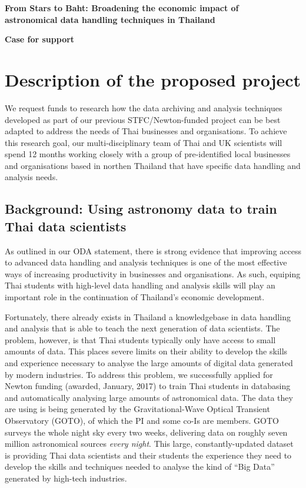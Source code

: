 \documentclass[11pt]{article}
\begin{document}
\setcounter{figure}{0}
\noindent
{\LARGE \bf From Stars to Baht: Broadening the economic impact of \\
astronomical data handling techniques in Thailand}

\vspace{3mm}

\noindent
{\LARGE \bf Case for support}
\section{Description of the proposed project}
\noindent
We request funds to research how the data archiving and analysis techniques developed as part of our previous STFC/Newton-funded project can be best adapted to address the needs of Thai businesses and organisations. To achieve this research goal, our multi-disciplinary team of Thai and UK scientists will spend 12 months working closely with a group of pre-identified local businesses and organisations based in northen Thailand that have specific data handling and analysis needs.

\subsection{Background: Using astronomy data to train Thai data scientists}
As outlined in our ODA statement, there is strong evidence that improving access to advanced data handling and analysis techniques is one of the most effective ways of increasing productivity in businesses and organisations. As such, equiping Thai students with high-level data handling and analysis skills will play an important role in the continuation of Thailand's economic development.

\vspace{2mm}
\noindent
Fortunately, there already exists in Thailand a knowledgebase in data handling and analysis that is able to teach the next generation of data scientists. The problem, however, is that Thai students typically only have access to small amounts of data. This places severe limits on their ability to develop the skills and experience necessary to analyse the large amounts of digital data generated by modern industries. To address this problem, we successfully applied for Newton funding (awarded, January, 2017) to train Thai students in databasing and automatically analysing large amounts of astronomical data. The data they are using is being generated by the Gravitational-Wave Optical Transient Observatory (GOTO), of which the PI and some co-Is are members. GOTO surveys the whole night sky every two weeks, delivering data on roughly seven million astronomical sources {\it every night}. This large, constantly-updated dataset is providing Thai data scientists and their students the experience they need to develop the skills and techniques needed to analyse the kind of ``Big Data'' generated by high-tech industries.
\end{document}
